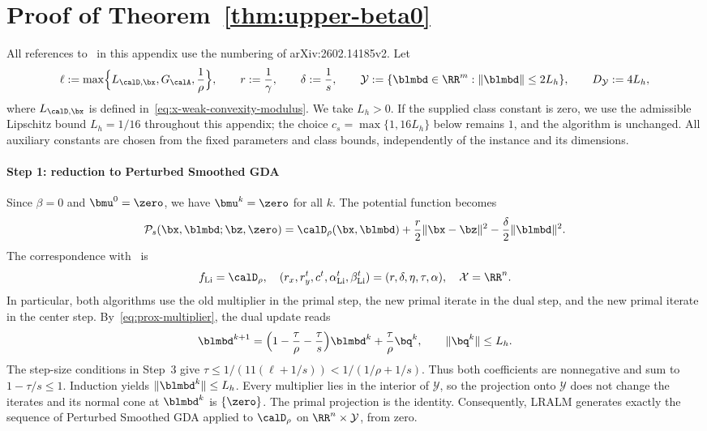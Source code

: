 \section{Proof of Theorem~\ref{thm:upper-beta0}}
\label{app:upper-beta0}

All references to~\cite{li2026smoothing} in this appendix use the numbering
of arXiv:2602.14185v2. Let
\[
\ell:=\max\Bigl\{L_{\calD,\bx},G_{\calA},\frac1\rho\Bigr\},
\qquad r:=\frac1\gamma,\qquad \delta:=\frac1s,
\qquad \mathcal Y:=\{\blmbd\in\RR^m:\|\blmbd\|\le2L_h\},
\qquad D_{\mathcal Y}:=4L_h,
\]
where \(L_{\calD,\bx}\) is defined in~\eqref{eq:x-weak-convexity-modulus}.
We take \(L_h>0\). If the supplied class constant is zero, we use the
admissible Lipschitz bound \(L_h=1/16\) throughout this appendix; the
choice \(c_s=\max\{1,16L_h\}\) below remains \(1\), and the algorithm is
unchanged. All auxiliary constants are chosen from the fixed parameters
and class bounds, independently of the instance and its dimensions.

\paragraph{Step 1: reduction to Perturbed Smoothed GDA}
Since \(\beta=0\) and \(\bmu^0=\zero\), we have \(\bmu^k=\zero\) for all
\(k\). The potential function becomes
\[
\mathcal P_s(\bx,\blmbd;\bz,\zero)
=\calD_\rho(\bx,\blmbd)+\frac r2\|\bx-\bz\|^2
-\frac\delta2\|\blmbd\|^2.
\]
The correspondence with~\cite[(3.1) and Algorithm~3]{li2026smoothing} is
\[
f_{\mathrm{Li}}=\calD_\rho,\quad
(r_x,r_y^t,c^t,\alpha^t_{\mathrm{Li}},\beta^t_{\mathrm{Li}})
=(r,\delta,\eta,\tau,\alpha),\quad
\mathcal X=\RR^n.
\]
In particular, both algorithms use the old multiplier in the primal step,
the new primal iterate in the dual step, and the new primal iterate in the
center step. By~\eqref{eq:prox-multiplier}, the dual update reads
\[
\blmbd^{k+1}
=\Bigl(1-\frac\tau\rho-\frac\tau s\Bigr)\blmbd^k
+\frac\tau\rho\bq^k,
\qquad \|\bq^k\|\le L_h.
\]
The step-size conditions in Step~3 give
\(\tau\le1/(11(\ell+1/s))<1/(1/\rho+1/s)\).
Thus both coefficients are nonnegative and sum to \(1-\tau/s\le1\).
Induction yields \(\|\blmbd^k\|\le L_h\). Every multiplier lies in the
interior of \(\mathcal Y\), so the projection onto \(\mathcal Y\) does not
change the iterates and its normal cone at \(\blmbd^k\) is
\(\{\zero\}\). The primal projection is the identity. Consequently,
LRALM generates exactly the sequence of Perturbed Smoothed GDA applied to
\(\calD_\rho\) on \(\RR^n\times\mathcal Y\), from zero.

